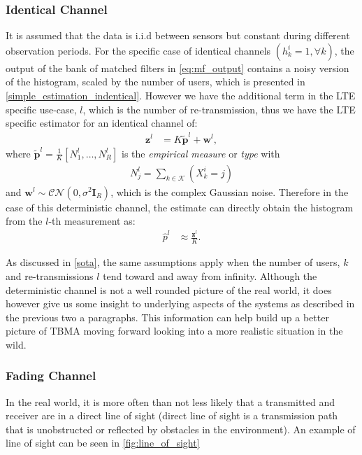 \documentclass{article}
\begin{document}
\subsubsection{Identical Channel}\label{det_chan}
It is assumed that the data is i.i.d between sensors but constant during different observation periods. For the specific case of identical channels ${(h^i_k = 1, \forall k)}$, the output of the bank of matched filters in \cref{eq:mf_output} contains a noisy version of the histogram, scaled by the number of users, which is presented in \cref{simple_estimation_indentical}. However we have the additional term in the LTE specific use-case, $l$, which is the number of re-transmission, thus we have the LTE specific estimator for an identical channel of:
%
\begin{align}
    \boldsymbol{z}^l &= K \tilde{\boldsymbol{p}}^l + \boldsymbol{w}^l, 
\end{align}
%
where $\tilde{\boldsymbol{p}}^l = \frac{1}{K}[N_1^l, \ldots, N_R^l]$ is the \emph{empirical measure} or \emph{type} with
\begin{align}
    N_j^l = \sum_{k \in \mathcal{K}}(X^i_k = j)
\end{align}
and $\boldsymbol{w}^l \sim \mathcal{CN}(0, {\sigma^2 \boldsymbol{I}_R})$, which is the complex Gaussian noise.
%
Therefore in the case of this deterministic channel, the estimate can directly obtain the histogram from the $l$-th measurement as:
%
\begin{align}
    \hat{p}^l &\approx \frac{\boldsymbol{z}^l}{K}. \label{eq:empf_h_const}
\end{align}

As discussed in \cref{sota}, the same assumptions apply when the number of users, $k$ and re-transmissions $l$ tend toward and away from infinity.
Although the deterministic channel is not a well rounded picture of the real world, it does however give us some insight to underlying aspects of the systems as described in the previous two a paragraphs. This information can help build up a better picture of TBMA moving forward looking into a more realistic situation in the wild.

\subsubsection{Fading Channel}\label{rand_chan}
In the real world, it is more often than not less likely that a transmitted and receiver are in a direct line of sight (direct line of sight is a transmission path that is unobstructed or reflected by obstacles in the environment). An example of line of sight can be seen in \cref{fig:line_of_sight}
\end{document}
